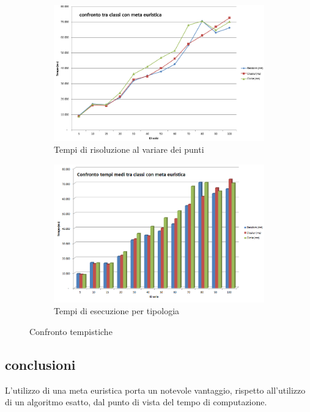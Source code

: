 \begin{figure}
\centering
\begin{subfigure}[b]{0.9\textwidth}
\includegraphics[width=\textwidth]{Images/Part_2/graphics/Times01.png}
\caption{Tempi di risoluzione al variare dei punti}
\label{pt2:time:time01}
\end{subfigure}

\begin{subfigure}[b]{0.9\textwidth}
\includegraphics[width=\textwidth]{Images/Part_2/graphics/Times02.png}
\caption{Tempi di esecuzione per tipologia}
\label{pt2:time:time02}
\end{subfigure}
\caption{Confronto tempistiche}
\label{pt1:time:times}
\end{figure}

\subsection[Conclusioni]{conclusioni}
\label{pt2:time:conclusion}
L'utilizzo di una meta euristica porta un notevole vantaggio, rispetto all'utilizzo di un algoritmo esatto, dal punto di vista del tempo di computazione.

